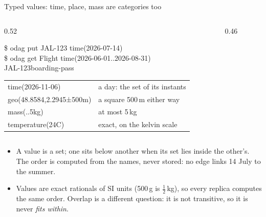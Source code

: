 \documentclass[aspectratio=169,11pt]{beamer}
\newcommand{\code}[1]{{\ttfamily #1}}
\begin{document}
{\begin{frame}{Typed values: time, place, mass are categories too}
  \begin{columns}[T]
    \begin{column}{0.52\textwidth}
      {\scriptsize\ttfamily
        \textcolor{soft}{\$} odag put JAL-123 \textquotesingle{}time(2026-07-14)\textquotesingle{}\\[0.4mm]
        \textcolor{soft}{\$} odag get Flight \textquotesingle{}time(2026-06-01..2026-08-31)\textquotesingle{}\\[0.4mm]
        JAL-123\quad boarding-pass\par}
      \vspace{3mm}
      \footnotesize
      \renewcommand{\arraystretch}{1.25}
      \begin{tabular}{@{}l@{\quad}l@{}}
        \code{time(2026-11-06)} & a day: the set of its instants \\
        \code{geo(48.8584,2.2945±500m)} & a square 500\,m either way \\
        \code{mass(..5kg)} & at most 5\,kg \\
        \code{temperature(24C)} & exact, on the kelvin scale \\
      \end{tabular}
    \end{column}
    \begin{column}{0.46\textwidth}
      \centering
    \end{column}
  \end{columns}
  \vspace{2mm}
  \small
  \begin{itemize}\setlength{\itemsep}{1mm}
    \item A value is a set; one sits below another when its set lies inside the other's. The order is computed from the names, never stored: no edge links 14 July to the summer.
    \item Values are exact rationals of SI units (500\,g is $\frac12$\,kg), so every replica computes the same order. Overlap is a different question: it is not transitive, so it is never \emph{fits within}.
  \end{itemize}
\end{frame}

}
\end{document}

